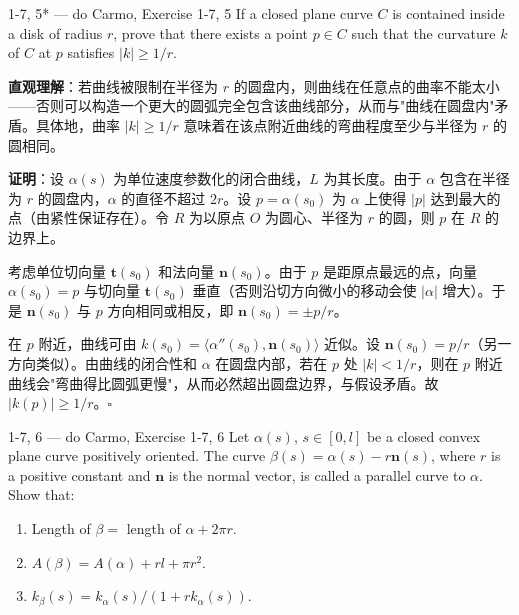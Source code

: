 \begin{exercise}{1-7, 5* — do Carmo, Exercise 1-7, 5}
If a closed plane curve $C$ is contained inside a disk of radius $r$, prove that there exists a point $p \in C$ such that the curvature $k$ of $C$ at $p$ satisfies $|k| \geq 1/r$.
\end{exercise}

\begin{solution}
\textbf{直观理解}：若曲线被限制在半径为 $r$ 的圆盘内，则曲线在任意点的曲率不能太小——否则可以构造一个更大的圆弧完全包含该曲线部分，从而与"曲线在圆盘内"矛盾。具体地，曲率 $|k| \geq 1/r$ 意味着在该点附近曲线的弯曲程度至少与半径为 $r$ 的圆相同。

\textbf{证明}：设 $\alpha(s)$ 为单位速度参数化的闭合曲线，$L$ 为其长度。由于 $\alpha$ 包含在半径为 $r$ 的圆盘内，$\alpha$ 的直径不超过 $2r$。设 $p = \alpha(s_0)$ 为 $\alpha$ 上使得 $|p|$ 达到最大的点（由紧性保证存在）。令 $R$ 为以原点 $O$ 为圆心、半径为 $r$ 的圆，则 $p$ 在 $R$ 的边界上。

考虑单位切向量 $\mathbf{t}(s_0)$ 和法向量 $\mathbf{n}(s_0)$。由于 $p$ 是距原点最远的点，向量 $\alpha(s_0) = p$ 与切向量 $\mathbf{t}(s_0)$ 垂直（否则沿切方向微小的移动会使 $|\alpha|$ 增大）。于是 $\mathbf{n}(s_0)$ 与 $p$ 方向相同或相反，即 $\mathbf{n}(s_0) = \pm p/r$。

在 $p$ 附近，曲线可由 $k(s_0) = \langle \alpha''(s_0), \mathbf{n}(s_0) \rangle$ 近似。设 $\mathbf{n}(s_0) = p/r$（另一方向类似）。由曲线的闭合性和 $\alpha$ 在圆盘内部，若在 $p$ 处 $|k| < 1/r$，则在 $p$ 附近曲线会"弯曲得比圆弧更慢"，从而必然超出圆盘边界，与假设矛盾。故 $|k(p)| \geq 1/r$。$\square$
\end{solution}

\begin{exercise}{1-7, 6 — do Carmo, Exercise 1-7, 6}
Let $\alpha(s)$, $s \in [0, l]$ be a closed convex plane curve positively oriented. The curve $\beta(s) = \alpha(s) - r\mathbf{n}(s)$, where $r$ is a positive constant and $\mathbf{n}$ is the normal vector, is called a parallel curve to $\alpha$. Show that:
\begin{enumerate}
\item[a.] Length of $\beta = $ length of $\alpha + 2\pi r$.
\item[b.] $A(\beta) = A(\alpha) + rl + \pi r^2$.
\item[c.] $k_\beta(s) = k_\alpha(s) / (1 + r k_\alpha(s))$.
\end{enumerate}
\end{exercise}

